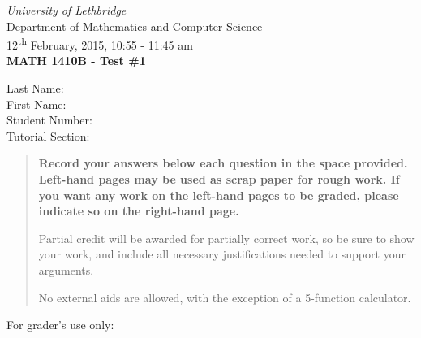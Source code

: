 \documentclass[12pt]{article}
\newcommand{\skipline}{\vspace{12pt}}
\begin{document}
\author{Instructor: Sean Fitzpatrick}
\thispagestyle{plain}
\begin{center}
\emph{University of Lethbridge}\\
Department of Mathematics and Computer Science\\
12\textsuperscript{th} February, 2015, 10:55 - 11:45 am\\
{\bf MATH 1410B - Test \#1}\\
\end{center}
\skipline \skipline \skipline \noindent \skipline
Last Name:\underline{\hspace{50pt}{\bf Solutions}\hspace{248pt}}\\
\skipline
First Name:\underline{\hspace{50pt}{\bf The}\hspace{275pt}}\\
\skipline
Student Number:\underline{\hspace{323pt}}\\
\skipline
Tutorial Section: \underline{\hspace{320pt}}\\


\vspace{0.5in}


\begin{quote}
 {\bf Record your answers below each question in the space provided.    Left-hand pages may be used as scrap paper for rough work.  If you want any work on the left-hand pages to be graded, please indicate so on the right-hand page.
 
 \bigskip
 
Partial credit will be awarded for partially correct work, so be sure to show your work, and include all necessary justifications needed to support your arguments.

\bigskip

No external aids are allowed, with the exception of a 5-function calculator.}
\end{quote}


\vspace{0.5in}

For grader's use only:
\end{document}
